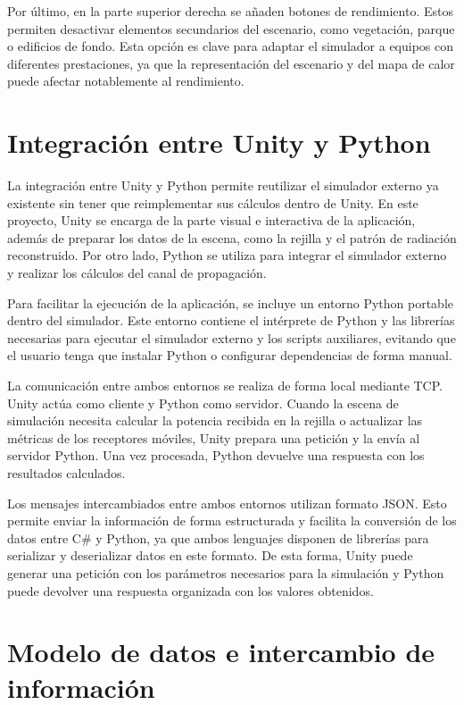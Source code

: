 Por último, en la parte superior derecha se añaden botones de rendimiento. Estos permiten desactivar elementos secundarios del escenario, como vegetación, parque o edificios de fondo. Esta opción es clave para adaptar el simulador a equipos con diferentes prestaciones, ya que la representación del escenario y del mapa de calor puede afectar notablemente al rendimiento.


\section{Integración entre Unity y Python}

La integración entre Unity y Python permite reutilizar el simulador externo ya existente sin tener que reimplementar sus cálculos dentro de Unity. En este proyecto, Unity se encarga de la parte visual e interactiva de la aplicación, además de preparar los datos de la escena, como la rejilla y el patrón de radiación reconstruido. Por otro lado, Python se utiliza para integrar el simulador externo y realizar los cálculos del canal de propagación.

Para facilitar la ejecución de la aplicación, se incluye un entorno Python portable dentro del simulador. Este entorno contiene el intérprete de Python y las librerías necesarias para ejecutar el simulador externo y los scripts auxiliares, evitando que el usuario tenga que instalar Python o configurar dependencias de forma manual.

La comunicación entre ambos entornos se realiza de forma local mediante TCP. Unity actúa como cliente y Python como servidor. Cuando la escena de simulación necesita calcular la potencia recibida en la rejilla o actualizar las métricas de los receptores móviles, Unity prepara una petición y la envía al servidor Python. Una vez procesada, Python devuelve una respuesta con los resultados calculados.

Los mensajes intercambiados entre ambos entornos utilizan formato JSON. Esto permite enviar la información de forma estructurada y facilita la conversión de los datos entre C\# y Python, ya que ambos lenguajes disponen de librerías para serializar y deserializar datos en este formato. De esta forma, Unity puede generar una petición con los parámetros necesarios para la simulación y Python puede devolver una respuesta organizada con los valores obtenidos.


\section{Modelo de datos e intercambio de información}

